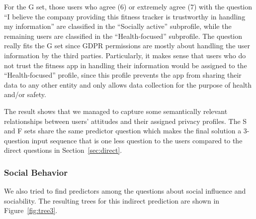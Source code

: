For the G set, those users who agree (6) or extremely agree (7) with the question ``I believe the company providing this fitness tracker is trustworthy in handling my information'' are classified in the ``Socially active'' subprofile, while the remaining users are classified in the ``Health-focused'' subprofile. The question really fits the G set since GDPR permissions are mostly about handling the user information by the third parties. Particularly, it makes sense that users who do not trust the fitness app in handling their information would be assigned to the ``Health-focused'' profile, since this profile prevents the app from sharing their data to any other entity and only allows data collection for the purpose of health and/or safety.



The result shows that we managed to capture some semantically relevant relationships between users' attitudes and their assigned privacy profiles. The S and F sets share the same predictor question which makes the final solution a 3-question input sequence that is one less question to the users compared to the direct questions in Section~\ref{sec:direct}.

\subsubsection{Social Behavior}
We also tried to find predictors among the questions about social influence and sociability. The resulting trees for this indirect prediction are shown in Figure~\ref{fig:tree3}.


